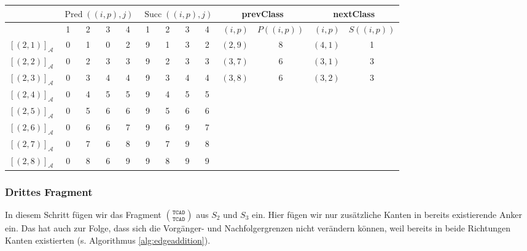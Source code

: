 \vspace{5pt}
\small
\begin{tabular}{|r|cccc|cccc||r|c|r|c|}
	\hline
	& \multicolumn{4}{c|}{$\operatorname{Pred}((i,p),j)$} & \multicolumn{4}{c||}{$\operatorname{Succ}((i,p),j)$} & \multicolumn{2}{c|}{\textrm{prevClass}} & \multicolumn{2}{c}{\textrm{nextClass}} \\ \hline
	\diagbox[dir=NW]{$(i,p)$}{$j$} & 1 & 2 & 3 & 4 & 1 & 2 & 3 & 4 & $(i,p)$ & $P((i,p))$ & $(i,p)$ & $S((i,p))$ \\ \hline
	$[(2,1)]_{\mathcal{A}}$ & 0 & 1 & 0 & 2 & 9 & 1 & 3 & 2 & $(2,9)$ & 8 & $(4,1)$ & 1 \\
	$[(2,2)]_{\mathcal{A}}$ & 0 & 2 & 3 & 3 & 9 & 2 & 3 & 3 & $(3,7)$ & 6 & $(3,1)$ & 3 \\
	$[(2,3)]_{\mathcal{A}}$ & 0 & 3 & 4 & 4 & 9 & 3 & 4 & 4 & $(3,8)$ & 6 & $(3,2)$ & 3 \\
	$[(2,4)]_{\mathcal{A}}$ & 0 & 4 & 5 & 5 & 9 & 4 & 5 & 5 & & & & \\
	$[(2,5)]_{\mathcal{A}}$ & 0 & 5 & 6 & 6 & 9 & 5 & 6 & 6 & & & & \\
	$[(2,6)]_{\mathcal{A}}$ & 0 & 6 & 6 & 7 & 9 & 6 & 9 & 7 & & & & \\
	$[(2,7)]_{\mathcal{A}}$ & 0 & 7 & 6 & 8 & 9 & 7 & 9 & 8 & & & & \\
	$[(2,8)]_{\mathcal{A}}$ & 0 & 8 & 6 & 9 & 9 & 8 & 9 & 9 & & & & \\
	\hline
\end{tabular}
\normalsize

\subsubsection{Drittes Fragment}

In diesem Schritt fügen wir das Fragment ${\texttt{TCAD}}\choose{\texttt{TCAD}}$ aus $S_2$ und $S_3$ ein. Hier fügen wir nur zusätzliche Kanten in bereits existierende Anker ein. Das hat auch zur Folge, dass sich die Vorgänger- und Nachfolgergrenzen nicht verändern können, weil bereits in beide Richtungen Kanten existierten (s. Algorithmus \ref{alg:edgeaddition}).

